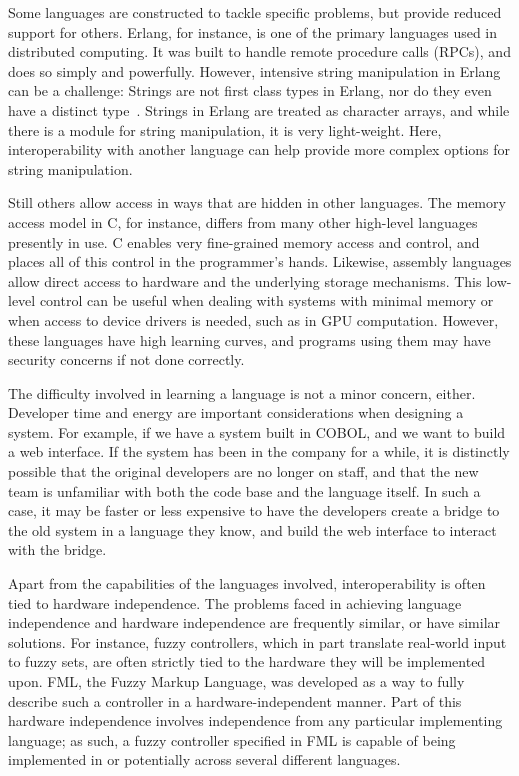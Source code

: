 \documentclass{sig-alternate}
\begin{document}
Some languages are constructed to tackle specific problems, but provide reduced support for others. Erlang, for instance, is one of the primary languages used in distributed computing. It was built to handle remote procedure calls (RPCs), and does so simply and powerfully. However, intensive string manipulation in Erlang can be a challenge: Strings are not first class types in Erlang, nor do they even have a distinct type~\cite{ErlangTypeDoc}. Strings in Erlang are treated as character arrays, and while there is a module for string manipulation, it is very light-weight. Here, interoperability with another language can help provide more complex options for string manipulation.

Still others allow access in ways that are hidden in other languages. The memory access model in C, for instance, differs from many other high-level languages presently in use. C enables very fine-grained memory access and control, and places all of this control in the programmer's hands. Likewise, assembly languages allow direct access to hardware and the underlying storage mechanisms. This low-level control can be useful when dealing with systems with minimal memory or when access to device drivers is needed, such as in GPU computation.  However, these languages have high learning curves, and programs using them may have security concerns if not done correctly.

The difficulty involved in learning a language is not a minor concern, either. Developer time and energy are important considerations when designing a system.
For example, if we have a system built in COBOL, and we want to build a web interface. If the system has been in the company for a while, it is distinctly possible that the original developers are no longer on staff, and that the new team is unfamiliar with both the code base and the language itself. In such a case, it may be faster or less expensive to have the developers create a bridge to the old system in a language they know, and build the web interface to interact with the bridge.

Apart from the capabilities of the languages involved, interoperability is often tied to hardware independence. The problems faced in achieving language independence and hardware independence are frequently similar, or have similar solutions. For instance, fuzzy controllers, which in part translate real-world input to fuzzy sets, are often strictly tied to the hardware they will be implemented upon. FML, the Fuzzy Markup Language, was developed as a way to fully describe such a controller in a hardware-independent manner. Part of this hardware independence involves independence from any particular implementing language; as such, a fuzzy controller specified in FML is capable of being implemented in or potentially across several different languages.~\cite{Acampora:2013}
\end{document}
